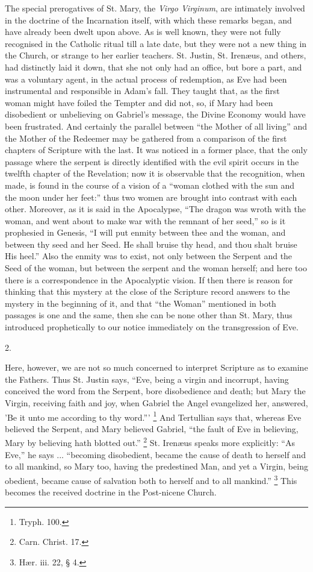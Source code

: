 
The special prerogatives of St. Mary, the \emph{Virgo Virginum},
are intimately involved in the doctrine of the Incarnation itself,
with which these remarks began, and have already been dwelt upon
above. As is well known, they were not fully recognised in the
Catholic ritual till a late date, but they were not a new thing in the
Church, or strange to her earlier teachers. St. Justin, St. Irenæus,
and others, had distinctly laid it down, that she not only had an
office, but bore a part, and was a voluntary agent, in the actual
process of redemption, as Eve had been instrumental and responsible in
Adam's fall. They taught that, as the first woman might have foiled
the Tempter and did not, so, if Mary had been disobedient or
unbelieving on Gabriel's message, the Divine Economy would have been
frustrated. And certainly the parallel between ``the Mother of all
living'' and the Mother of the Redeemer may be gathered from a
comparison of the first chapters of Scripture with the last. It was
noticed in a former place, that the only passage where the serpent is
directly identified with the evil spirit occurs in the twelfth chapter
of the Revelation; now it is observable that the recognition, when
made, is found in the course of a vision of a ``woman clothed with
the sun and the moon under her feet:'' thus two women are brought
into contrast with each other. Moreover, as it is said in the
Apocalypse, ``The dragon was wroth with the woman, and went about
to make war with the remnant of her seed,'' so is it prophesied in
Genesis, ``I will put enmity between thee and the woman, and
between thy seed and her Seed. He shall bruise thy head, and thou
shalt bruise His heel.'' Also the enmity was to exist, not only
between the Serpent and the Seed of the woman, but between the serpent
and the woman herself; and here too there is a correspondence in the
Apocalyptic vision. If then there is reason for thinking that this
mystery at the close of the Scripture record answers to the mystery in
the beginning of it, and that ``the Woman'' mentioned in both
passages is one and the same, then she can be none other than St.
Mary, thus introduced prophetically to our notice immediately on the
transgression of Eve.

2.

Here, however, we are not so much concerned to interpret Scripture
as to examine the Fathers. Thus St. Justin says, ``Eve, being a
virgin and incorrupt, having conceived the word from the Serpent, bore
disobedience and death; but Mary the Virgin, receiving faith and joy,
when Gabriel the Angel evangelized her, answered, 'Be it unto me
according to thy word.''' \footnote{Tryph. 100.} And Tertullian says that, whereas Eve believed the Serpent,
and Mary believed Gabriel, ``the fault of Eve in believing, Mary
by believing hath blotted out.'' \footnote{Carn. Christ. 17.} St. Irenæus speaks more explicitly: ``As Eve,'' he
says ... ``becoming disobedient, became the cause of death to
herself and to all mankind, so Mary too, having the predestined Man,
and yet a Virgin, being obedient, became cause of salvation both to
herself and to all mankind.'' \footnote{Hær. iii. 22, § 4.} This becomes the received doctrine in the Post-nicene Church.

